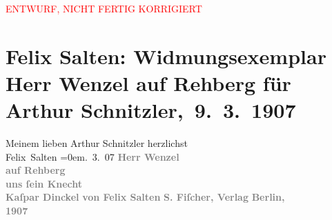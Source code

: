 
\begin{center}
            \textcolor{red}{ENTWURF, NICHT FERTIG KORRIGIERT}
                      \end{center}
            
         
         \renewcommand{\erwaehntePersonen}{Personen: Felix Salten}
         \renewcommand{\erwaehnteInstitutionen}{Institutionen: S. Fischer Verlag}
         \renewcommand{\erwaehnteOrte}{Orte: Berlin, Wien}
         \renewcommand{\erwaehnteWerke}{Werke: Herr Wenzel auf Rehberg. Novelle}
               \section[ Felix Salten: Widmungsexemplar Herr Wenzel auf Rehberg für Arthur Schnitzler, 9. 3. 1907]{ Felix Salten: Widmungsexemplar Herr Wenzel auf Rehberg für Arthur
               Schnitzler, 9. 3. 1907}\nopagebreak{}\rehead{ }\begin{ledgroupsized}[t]{13cm}\normalsize\beginnumbering \toendnotes[C]{\smallbreak\pagebreak[2]} 
\pstart
           \noindent{}{\pb}Meinem lieben Arthur Schnitzler\pend
           \pstart
           herzlichst{\\[\baselineskip]}\spacefill\mbox{Felix Salten}\pend
           \leftskip=0em{}. 3. 07\pend
           {\bigskip}\pstart
           \noindent{}\centering{}\textcolor{gray}{\textbf{Herr Wenzel {\\}auf Rehberg {\\}uns ſein Knecht
                     {\\}Kaſpar Dinckel}}\pend
           \pstart
           \noindent{}\centering{}\textcolor{gray}{\textbf{von Felix Salten}}\pend
           {\bigskip}\pstart
           \noindent{}\centering{}\textcolor{gray}{\textbf{S. Fiſcher, Verlag}}\pend
           \pstart
           \noindent{}\centering{}\textcolor{gray}{\textbf{Berlin,}}{ }{\\}\textcolor{gray}{\textbf{1907}}\pend
           
         
         \endnumbering{}\end{ledgroupsized}  \newcommand{\dateiname}{L03046}\newcommand{\titel}{Felix Salten: Widmungsexemplar Herr Wenzel auf Rehberg für Arthur Schnitzler, 9. 3. 1907}\newcommand{\editorInnen}{Martin Anton Müller und Laura Untner}
      